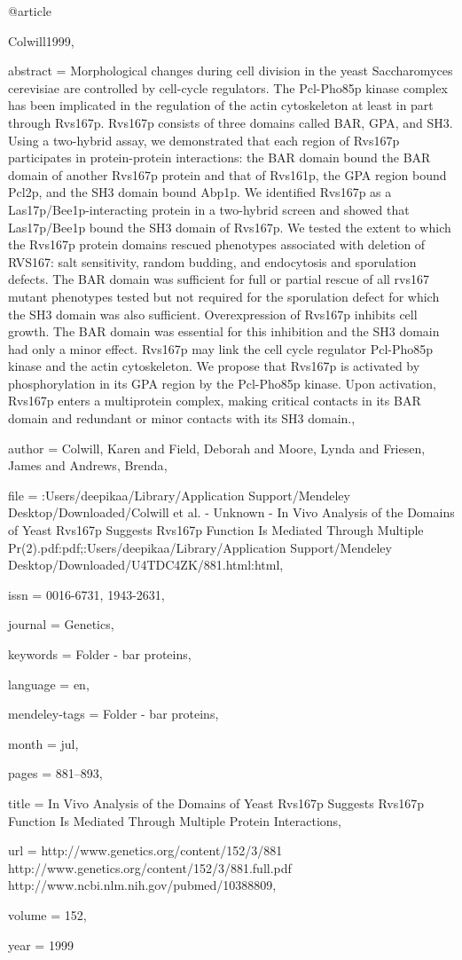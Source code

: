 @article{Colwill1999,

abstract = {Morphological changes during cell division in the yeast Saccharomyces cerevisiae are controlled by cell-cycle regulators. The Pcl-Pho85p kinase complex has been implicated in the regulation of the actin cytoskeleton at least in part through Rvs167p. Rvs167p consists of three domains called BAR, GPA, and SH3. Using a two-hybrid assay, we demonstrated that each region of Rvs167p participates in protein-protein interactions: the BAR domain bound the BAR domain of another Rvs167p protein and that of Rvs161p, the GPA region bound Pcl2p, and the SH3 domain bound Abp1p. We identified Rvs167p as a Las17p/Bee1p-interacting protein in a two-hybrid screen and showed that Las17p/Bee1p bound the SH3 domain of Rvs167p. We tested the extent to which the Rvs167p protein domains rescued phenotypes associated with deletion of RVS167: salt sensitivity, random budding, and endocytosis and sporulation defects. The BAR domain was sufficient for full or partial rescue of all rvs167 mutant phenotypes tested but not required for the sporulation defect for which the SH3 domain was also sufficient. Overexpression of Rvs167p inhibits cell growth. The BAR domain was essential for this inhibition and the SH3 domain had only a minor effect. Rvs167p may link the cell cycle regulator Pcl-Pho85p kinase and the actin cytoskeleton. We propose that Rvs167p is activated by phosphorylation in its GPA region by the Pcl-Pho85p kinase. Upon activation, Rvs167p enters a multiprotein complex, making critical contacts in its BAR domain and redundant or minor contacts with its SH3 domain.},

author = {Colwill, Karen and Field, Deborah and Moore, Lynda and Friesen, James and Andrews, Brenda},

file = {:Users/deepikaa/Library/Application Support/Mendeley Desktop/Downloaded/Colwill et al. - Unknown - In Vivo Analysis of the Domains of Yeast Rvs167p Suggests Rvs167p Function Is Mediated Through Multiple Pr(2).pdf:pdf;:Users/deepikaa/Library/Application Support/Mendeley Desktop/Downloaded/U4TDC4ZK/881.html:html},

issn = {0016-6731, 1943-2631},

journal = {Genetics},

keywords = {Folder - bar proteins},

language = {en},

mendeley-tags = {Folder - bar proteins},

month = {jul},

pages = {881--893},

title = {{In Vivo Analysis of the Domains of Yeast Rvs167p Suggests Rvs167p Function Is Mediated Through Multiple Protein Interactions}},

url = {http://www.genetics.org/content/152/3/881 http://www.genetics.org/content/152/3/881.full.pdf http://www.ncbi.nlm.nih.gov/pubmed/10388809},

volume = {152},

year = {1999}

}

